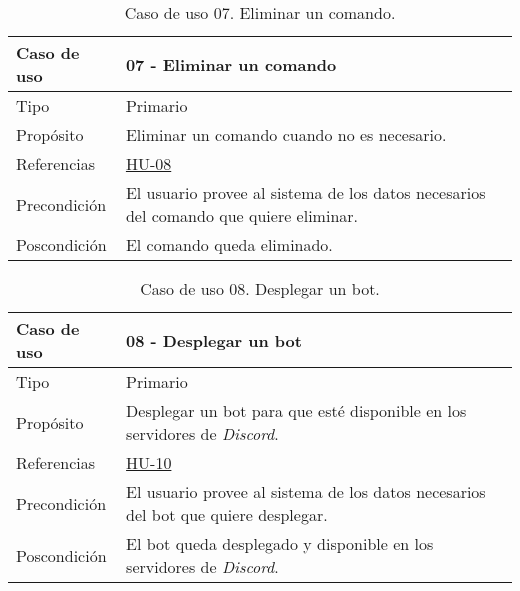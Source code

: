 \begin{table}[H]
    \centering
    \def\arraystretch{1.25}
    \begin{adjustbox}{max width=\textwidth}
    \begin{tabularx}{\textwidth}{|l|L|}
    \hline
        \textbf{Caso de uso} & \textbf{07 - Eliminar un comando} \\ \hline
    \hline
        Tipo & Primario \\ \hline
        Propósito & Eliminar un comando cuando no es necesario. \\ \hline
        Referencias & \hyperref[sec:hu08]{HU-08} \\ \hline
        Precondición & El usuario provee al sistema de los datos necesarios del comando que quiere eliminar. \\ \hline
        Poscondición & El comando queda eliminado. \\ \hline
    \end{tabularx}
    \end{adjustbox}
    \caption{Caso de uso 07. Eliminar un comando.}
\end{table}

\begin{table}[H]
    \centering
    \def\arraystretch{1.25}
    \begin{adjustbox}{max width=\textwidth}
    \begin{tabularx}{\textwidth}{|l|L|}
    \hline
        \textbf{Caso de uso} & \textbf{08 - Desplegar un bot} \\ \hline
    \hline
        Tipo & Primario \\ \hline
        Propósito & Desplegar un bot para que esté disponible en los servidores de \textit{Discord}. \\ \hline
        Referencias & \hyperref[sec:hu10]{HU-10} \\ \hline
        Precondición & El usuario provee al sistema de los datos necesarios del bot que quiere desplegar. \\ \hline
        Poscondición & El bot queda desplegado y disponible en los servidores de \textit{Discord}. \\ \hline
    \end{tabularx}
    \end{adjustbox}
    \caption{Caso de uso 08. Desplegar un bot.}
\end{table}

